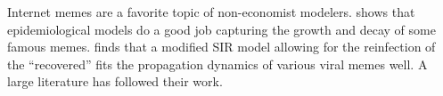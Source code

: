 Internet memes are a favorite topic of non-economist modelers. \href{https://github.com/iworld1991/EpiExp/blob/master/Literature/bauckhage2011insights.pdf}{\cite{bauckhage2011insights}} shows that epidemiological models do a good job capturing the growth and decay of some famous memes. \cite{wang2011epidemiological} finds that a modified SIR model allowing for the reinfection of the ``recovered'' fits  the propagation dynamics of various viral memes well.   A large literature has followed their work. %




